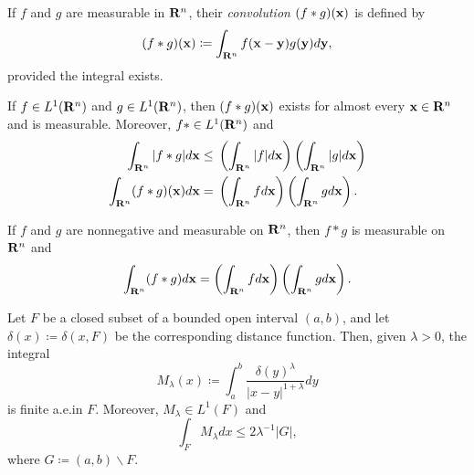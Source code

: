 If $f$ and $g$ are measurable in $\mathbf{R}^n$, their \emph{convolution
  $(f*g)(\mathbf{x})$} is defined by
\[
(f*g)(\mathbf{x})\coloneqq\int_{\mathbf{R}^n}f(\mathbf{x}-\mathbf{y})g(\mathbf{y}) d \mathbf{y},
\]
provided the integral exists.
\begin{theorem*}[6.14]
If $f\in L^1(\mathbf{R}^n)$ and $g\in L^1(\mathbf{R}^n)$, then $(f*g)(\mathbf{x})$ exists for
almost every $\mathbf{x}\in\mathbf{R}^n$ and is measurable. Moreover, $f*\in
L^1(\mathbf{R}^n)$ and
\[
\begin{aligned}
\int_{\mathbf{R}^n}|f*g| d \mathbf{x}
\leq{}&\left(\int_{\mathbf{R}^n}|f| d \mathbf{x}\right)\left(\int_{\mathbf{R}^n}|g| d \mathbf{x}\right)\\
\int_{\mathbf{R}^n}(f*g)(\mathbf{x}) d \mathbf{x}
={}&\left(\int_{\mathbf{R}^n}f d \mathbf{x}\right)\left(\int_{\mathbf{R}^n}g d \mathbf{x}\right).
\end{aligned}
\]
\end{theorem*}
\begin{corollary*}[6.16]
If $f$ and $g$ are nonnegative and measurable on $\mathbf{R}^n$, then $f*g$ is
measurable on $\mathbf{R}^n$ and
\[
\int_{\mathbf{R}^n}(f*g) d \mathbf{x}=
\left(\int_{\mathbf{R}^n} f d \mathbf{x}\right)
\left(\int_{\mathbf{R}^n}g d \mathbf{x}\right).
\]
\end{corollary*}
\begin{theorem*}[6.17, Marcinkiewicz]
Let $F$ be a closed subset of a bounded open interval $(a,b)$, and let
$\delta(x)\coloneqq\delta(x,F)$ be the corresponding distance
function. Then, given $\lambda>0$, the integral
\[
M_\lambda(x)\coloneqq\int_a^b\frac{\delta(y)^\lambda}{|x-y|^{1+\lambda}} d  y
\]
is finite a.e.\@ in $F$. Moreover, $M_\lambda\in L^1(F)$ and
\[
\int_F M_\lambda d  x\leq 2\lambda^{-1}|G|,
\]
where $G\coloneqq(a,b)\smallsetminus F$.
\end{theorem*}

